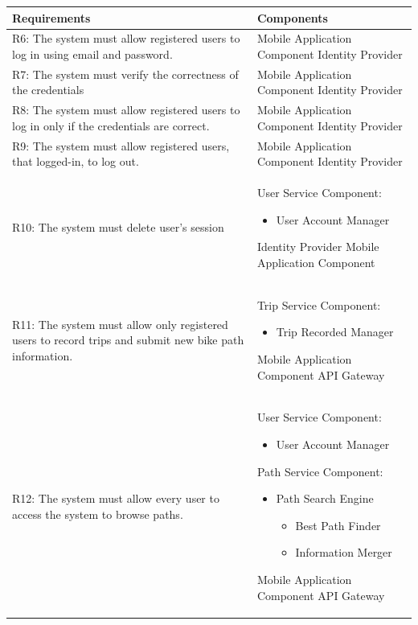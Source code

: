 \begin{table}[ht]
\begin{tabular}{|p{9cm}|p{6cm}|}
\hline
\textbf{Requirements}      & \multicolumn{1}{l|}{\textbf{Components}}\\ \hline
R6: The system must allow registered users to log in using email and password. 
&
Mobile Application Component
\newline
Identity Provider
\\ 
\hline
R7: The system must verify the correctness of the credentials  
&
Mobile Application Component
\newline
Identity Provider
\\ \hline
R8: The system must allow registered users to log in only if the credentials are correct. 
&
Mobile Application Component
\newline
Identity Provider
\\ \hline
R9: The system must allow registered users, that logged-in, to log out. 
&
Mobile Application Component
\newline
Identity Provider
\\ \hline
R10: The system must delete user’s session 
&
User Service Component:
\begin{itemize}
    \item User Account Manager
\end{itemize}
Identity Provider
\newline
Mobile Application Component
\\ \hline
R11: The system must allow only registered users to record trips and submit new bike path information. 
&
Trip Service Component:
\begin{itemize}
    \item Trip Recorded Manager
\end{itemize}
Mobile Application Component
\newline
API Gateway

\\ \hline
R12: The system must allow every user to access the system to browse paths. 
&
User Service Component:
\begin{itemize}
    \item User Account Manager
\end{itemize}
Path Service Component:
\begin{itemize}
    \item Path Search Engine
        \begin{itemize}
            \item Best Path Finder
            \item Information Merger
            \newline
        \end{itemize}
\end{itemize}
Mobile Application Component
\newline
API Gateway

\\ \hline
\end{tabular}
\end{table}
\newpage
